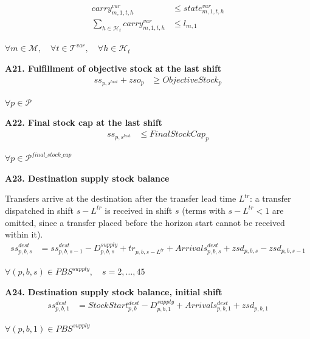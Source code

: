 \documentclass{article}
\begin{document}
\begin{align}
carry^{var}_{m,1,t,h}
&\le
state^{var}_{m,1,t,h}
\label{eq:A20_var_first_shift_carry_current_state}
\\
\sum_{h\in\mathcal{H}_t}
carry^{var}_{m,1,t,h}
&\le
l_{m,1}
\label{eq:A20_var_first_shift_carry_limit}
\end{align}
\begin{center}
$\forall m \in \mathcal{M}, \quad
\forall t \in \mathcal{T}^{var}, \quad
\forall h \in \mathcal{H}_t$
\end{center}
\noindent\textbf{A21. Fulfillment of objective stock at the last shift}
\begin{align}
ss_{p,s^{last}} + zso_p
&\ge
ObjectiveStock_p
\label{eq:A21_objective_stock}
\end{align}
\begin{center}
$\forall p \in \mathcal{P}$
\end{center}

\noindent\textbf{A22. Final stock cap at the last shift}
\begin{align}
ss_{p,s^{last}}
&\le
FinalStockCap_p
\label{eq:A22_final_stock_cap}
\end{align}
\begin{center}
$\forall p \in \mathcal{P}^{final\_stock\_cap}$
\end{center}

\noindent\textbf{A23. Destination supply stock balance}

Transfers arrive at the destination after the transfer lead time $L^{tr}$: a transfer dispatched in shift $s-L^{tr}$ is received in shift $s$ (terms with $s-L^{tr} < 1$ are omitted, since a transfer placed before the horizon start cannot be received within it).
\begin{align}
ss^{dest}_{p,b,s}
&=
ss^{dest}_{p,b,s-1}
- D^{supply}_{p,b,s}
+ tr_{p,b,s-L^{tr}}
+ Arrivals^{dest}_{p,b,s}
+ zsd_{p,b,s}
- zsd_{p,b,s-1}
\label{eq:A23_dest_supply_balance}
\end{align}
\begin{center}
$\forall (p,b,s) \in PBS^{supply}, \quad s = 2,\dots,45$
\end{center}

\noindent\textbf{A24. Destination supply stock balance, initial shift}
\begin{align}
ss^{dest}_{p,b,1}
&=
StockStart^{dest}_{p,b}
- D^{supply}_{p,b,1}
+ Arrivals^{dest}_{p,b,1}
+ zsd_{p,b,1}
\label{eq:A24_dest_supply_initial}
\end{align}
\begin{center}
$\forall (p,b,1) \in PBS^{supply}$
\end{center}
\end{document}
